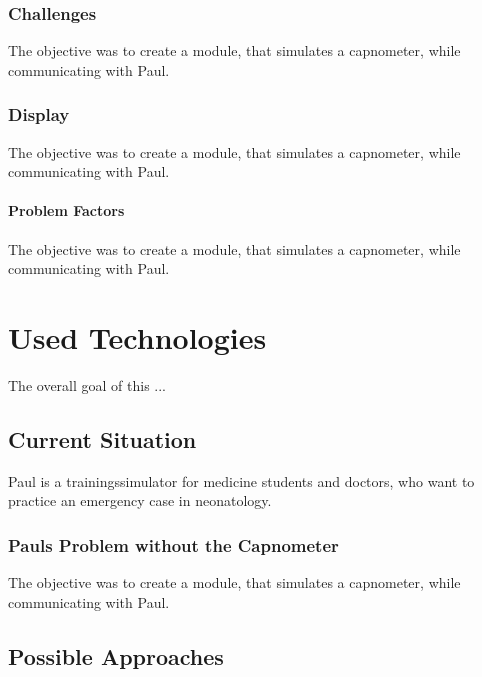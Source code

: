 \documentclass[12pt]{article}
\begin{document}
\subsubsection{Challenges}

The objective was to create a module, that simulates a capnometer, while communicating
with Paul.


\subsubsection{Display}

The objective was to create a module, that simulates a capnometer, while communicating
with Paul.


\paragraph{Problem Factors}

The objective was to create a module, that simulates a capnometer, while communicating
with Paul.


\clearpage



\section{Used Technologies}

The overall goal of this ...


\subsection{Current Situation}

Paul is a trainingssimulator for medicine students and doctors, who want to practice
an emergency case in neonatology.


\subsubsection{Pauls Problem without the Capnometer}

The objective was to create a module, that simulates a capnometer, while communicating
with Paul.


\subsection{Possible Approaches}
\end{document}
